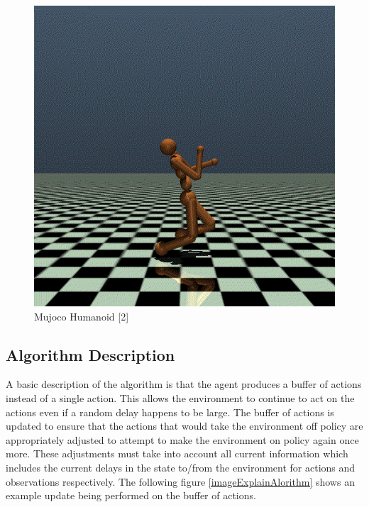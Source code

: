 \documentclass{article} %
\begin{document}
\begin{figure}[H]
\begin{center}
\includegraphics[scale=0.2]{images/mujoco_humanoid_static}
\end{center}
\caption{Mujoco Humanoid [2]}
\label{mujoco_Humanoid}
\end{figure}

\subsection{Algorithm Description}

A basic description of the algorithm is that the agent produces a buffer of actions instead of a 
single action. 
This allows the environment to continue to act on the actions even if a random delay happens to be large.
The buffer of actions is updated to ensure that the actions that would take the environment off policy
are appropriately adjusted to attempt to make the environment on policy again once more.
These adjustments must take into account all current information which includes the current delays in 
the state to/from the environment for actions and observations respectively.
The following figure \ref{imageExplainAlorithm} shows an example update being 
performed on the buffer of actions.
\end{document}
